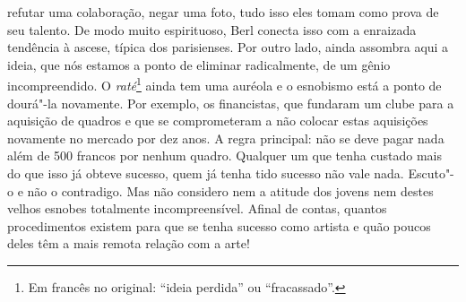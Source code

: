 refutar uma colaboração, negar uma foto, tudo isso eles tomam como prova
de seu talento. De modo muito espirituoso, Berl conecta isso com a
enraizada tendência à ascese, típica dos parisienses. Por outro lado,
ainda assombra aqui a ideia, que nós estamos a ponto de eliminar
radicalmente, de um gênio incompreendido. O \emph{raté}\footnote{Em francês no original:
  ``ideia perdida'' ou ``fracassado''. \versal{[N. T.]}} ainda tem
uma auréola e o esnobismo está a ponto de dourá"-la novamente. Por
exemplo, os financistas, que fundaram um clube para a aquisição de
quadros e que se comprometeram a não colocar estas aquisições novamente
no mercado por dez anos. A regra principal: não se deve pagar nada além
de 500 francos por nenhum quadro. Qualquer um que tenha custado mais do
que isso já obteve sucesso, quem já tenha tido sucesso não vale nada.
Escuto"-o e não o contradigo. Mas não considero nem a atitude dos jovens
nem destes velhos esnobes totalmente incompreensível. Afinal de contas,
quantos procedimentos existem para que se tenha sucesso como artista e
quão poucos deles têm a mais remota relação com a arte!

